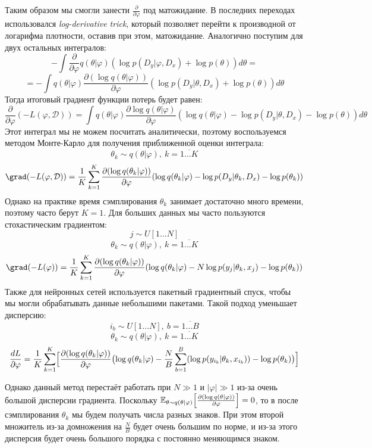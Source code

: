 Таким образом мы смогли занести $\frac{\partial}{\partial\varphi}$ под матожидание. В последних переходах использовался \textit{log-derivative trick}, который позволяет перейти к производной от логарифма плотности, оставив при этом, матожидание.
 Аналогично поступим для двух остальных интегралов:
$$-\int \frac{\partial}{\partial\varphi} q(\theta | \varphi) (\log p(D_y | \varphi, D_x) + \log p(\theta)) d\theta =$$
$$=-\int q(\theta | \varphi) \frac{\partial (\log q(\theta | \varphi))}{\partial\varphi} (\log p(D_y | \theta, D_x) + \log p(\theta)) d\theta$$
Тогда итоговый градиент функции потерь будет равен:
$$\frac{\partial}{\partial\varphi} (-L(\varphi, \mathcal{D})) = \int q(\theta | \varphi) \frac{\partial \log q(\theta | \varphi)}{\partial\varphi} (\log q(\theta | \varphi) - \log p(D_y | \theta, D_x) - \log p(\theta)) d\theta$$
Этот интеграл мы не можем посчитать аналитически, поэтому воспользуемся методом Монте-Карло для получения приближенной оценки интеграла\cite{black-box-vi}:
$$\theta_k \sim q(\theta | \varphi),\ k = \overline{1...K}$$
$$\grad (-L(\varphi, \mathcal{D})) = \displaystyle \frac{1}{K}\sum_{k=1}^{K} \frac{\partial(\log q(\theta_k | \varphi))}{\partial\varphi} (\log q(\theta_k | \varphi) - \log p(D_y | \theta_k, D_x) - \log p(\theta_k))$$
Однако на практике время сэмплирования $\theta_k$ занимает достаточно много времени, поэтому часто берут $K=1$. Для больших данных мы часто пользуются стохастическим градиентом:
$$j \sim U[1...N]$$
$$\theta_k \sim q(\theta | \varphi),\ k = \overline{1...K}$$
$$\grad (-L(\varphi)) = \displaystyle \frac{1}{K}\sum_{k=1}^K \frac{\partial(\log q(\theta_k | \varphi))}{\partial\varphi} (\log q(\theta_k | \varphi) - N\log p(y_j | \theta_k, x_j) - \log p(\theta_k))$$
Также для нейронных сетей используется пакетный градиентный спуск, чтобы мы могли обрабатывать данные небольшими пакетами. Такой подход уменьшает дисперсию:
$$i_b \sim U[1...N],\ b = \overline{1...B}$$
$$\theta_k \sim q(\theta | \varphi),\ k = \overline{1...K}$$
$$\frac{dL}{\partial\varphi}=\frac{1}{K} \sum_{k=1}^K \Bigl[\frac{\partial(\log q(\theta_k | \varphi))}{\partial\varphi} \bigl(\log q(\theta_k | \varphi) - \frac{N}{B} \sum_{b=1}^B (\log p(y_{i_b} | \theta_k, x_{i_b})) - \log p(\theta_k)\bigr)\Bigr]$$

Однако данный метод перестаёт работать при $N \gg 1$ и $|\varphi| \gg 1$ из-за очень большой дисперсии градиента.
 Поскольку $\mathbb{E}_{\theta \sim q(\theta | \varphi)} \Bigl[\frac{\partial(\log q(\theta | \varphi))}{\partial \varphi}\Bigr] = 0$,
 то в после сэмплирования $\theta_k$ мы будем получать числа разных знаков. При этом второй множитель из-за домножения на $\frac{N}{B}$
 будет очень большим по норме, и из-за этого дисперсия будет очень большого порядка с постоянно меняющимся знаком.

